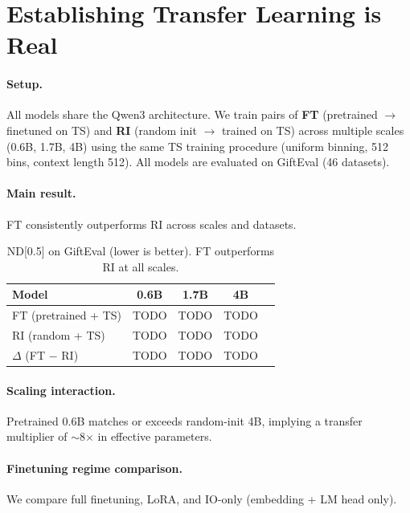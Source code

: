 \section{Establishing Transfer Learning is Real}
\label{sec:transfer}


\paragraph{Setup.} All models share the Qwen3 architecture. We train pairs of \textbf{FT} (pretrained $\to$ finetuned on TS) and \textbf{RI} (random init $\to$ trained on TS) across multiple scales (0.6B, 1.7B, 4B) using the same TS training procedure (uniform binning, 512 bins, context length 512). All models are evaluated on GiftEval (46 datasets).

\paragraph{Main result.} FT consistently outperforms RI across scales and datasets.

\begin{table}[h]
\centering
\caption{ND[0.5] on GiftEval (lower is better). FT outperforms RI at all scales.}
\label{tab:benchmark}
\begin{tabular}{lcccc}
\toprule
Model & 0.6B & 1.7B & 4B \\
\midrule
FT (pretrained + TS)  & TODO & TODO & TODO \\
RI (random + TS)      & TODO & TODO & TODO \\
\midrule
$\Delta$ (FT $-$ RI)  & TODO & TODO & TODO \\
\bottomrule
\end{tabular}
\end{table}

\paragraph{Scaling interaction.} Pretrained 0.6B matches or exceeds random-init 4B, implying a transfer multiplier of $\sim$8$\times$ in effective parameters.


\paragraph{Finetuning regime comparison.} We compare full finetuning, LoRA, and IO-only (embedding + LM head only).
